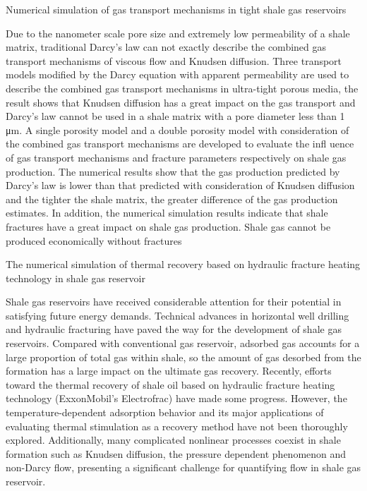 \documentclass{article}
\begin{document}
Numerical simulation of gas transport mechanisms in tight shale gas reservoirs

 Due to the nanometer scale pore size and extremely low permeability of a shale matrix, 
traditional Darcy’s law can not exactly describe the combined gas transport mechanisms of viscous 
flow and Knudsen diffusion. Three transport models modified by the Darcy equation with apparent 
permeability are used to describe the combined gas transport mechanisms in ultra-tight porous media, 
the result shows that Knudsen diffusion has a great impact on the gas transport and Darcy’s law cannot 
be used in a shale matrix with a pore diameter less than 1 μm. A single porosity model and a double 
porosity model with consideration of the combined gas transport mechanisms are developed to evaluate 
the infl uence of gas transport mechanisms and fracture parameters respectively on shale gas production. 
The numerical results show that the gas production predicted by Darcy’s law is lower than that predicted 
with consideration of Knudsen diffusion and the tighter the shale matrix, the greater difference of the gas 
production estimates. In addition, the numerical simulation results indicate that shale fractures have a 
great impact on shale gas production. Shale gas cannot be produced economically without fractures

 The numerical simulation of thermal recovery based on hydraulic fracture heating technology in shale gas reservoir
 
Shale gas reservoirs have received considerable attention for their potential in satisfying future energy demands. Technical advances in horizontal well drilling and hydraulic fracturing have paved the way for the development of shale gas reservoirs. Compared with conventional gas reservoir, adsorbed gas accounts for a large proportion of total gas within shale, so the amount of gas desorbed from the formation has a large impact on the ultimate gas recovery. Recently, efforts toward the thermal recovery of shale oil based on hydraulic fracture heating technology (ExxonMobil's Electrofrac) have made some progress. However, the temperature-dependent adsorption behavior and its major applications of evaluating thermal stimulation as a recovery method have not been thoroughly explored. Additionally, many complicated nonlinear processes coexist in shale formation such as Knudsen diffusion, the pressure dependent phenomenon and non-Darcy flow, presenting a significant challenge for quantifying flow in shale gas reservoir.
\end{document}

